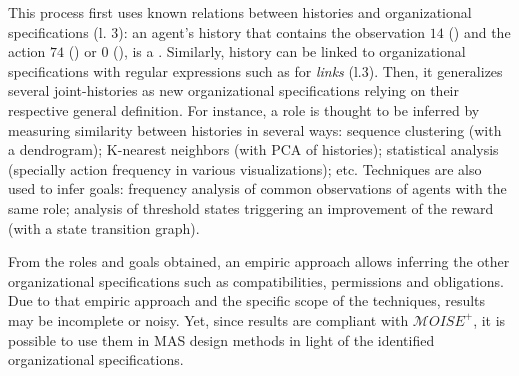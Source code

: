 This process first uses known relations between histories and organizational specifications (l. 3): an agent's history that contains the observation $14$ () and the action $74$ () or $0$ (), is a . Similarly, history can be linked to organizational specifications with regular expressions such as for \emph{links} (l.3).
Then, it generalizes several joint-histories as new organizational specifications relying on their respective general definition.
%
For instance, a role is thought to be inferred by measuring similarity between histories in several ways: sequence clustering (with a dendrogram); K-nearest neighbors (with PCA of histories); statistical analysis (specially action frequency in various visualizations); etc.
%
Techniques are also used to infer goals: frequency analysis of common observations of agents with the same role; analysis of threshold states triggering an improvement of the reward (with a state transition graph).

From the roles and goals obtained, an empiric approach allows inferring the other organizational specifications such as compatibilities, permissions and obligations.
Due to that empiric approach and the specific scope of the techniques, results may be incomplete or noisy. Yet, since results are compliant with $\mathcal{M}OISE^+$, it is possible to use them in MAS design methods in light of the identified organizational specifications.






